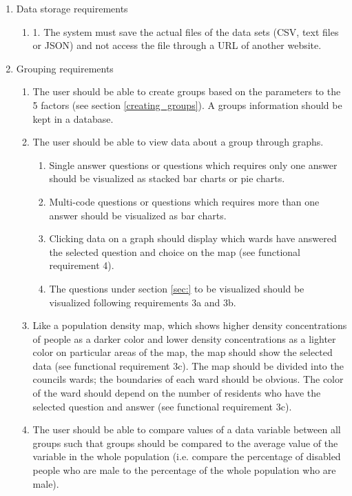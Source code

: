 \begin{enumerate}
  \item Data storage requirements
    \begin{enumerate}
      \item 1.	The system must save the actual files of the data sets (CSV, text files or JSON) and not access the file through a URL of another website.
    \end{enumerate}
  \item Grouping requirements
    \begin{enumerate}
		\item The user should be able to create groups based on the parameters to the 5 factors (see section \ref{creating_groups}). A group\textquotesingle s information should be kept in a database.
		\item The user should be able to view data about a group through graphs.
			\begin{enumerate}
				\item Single answer questions or questions which requires only one answer should be visualized as stacked bar charts or pie charts.
				\item Multi-code questions or questions which requires more than one answer should be visualized as bar charts.
				\item Clicking data on a graph should display which wards have answered the selected question and choice on the map (see functional requirement 4).
				\item The questions under section \ref{sec:} to be visualized should be visualized following requirements 3a and 3b.
			\end{enumerate}
		\item Like a population density map, which shows higher density concentrations of people as a darker color and lower density concentrations as a lighter color on particular areas of the map, the map should show the selected data (see functional requirement 3c). The map should be divided into the council\textquotesingle s wards; the boundaries of each ward should be obvious. The color of the ward should depend on the number of residents who have the selected question and answer (see functional requirement 3c).
		\item The user should be able to compare values of a data variable between all groups such that groups should be compared to the average value of the variable in the whole population (i.e. compare the percentage of disabled people who are male to the percentage of the whole population who are male).

\end{enumerate}
\end{enumerate}
